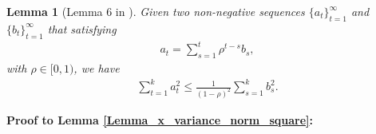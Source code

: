 \documentclass{article}
\newtheorem{Lemma}{\bf{Lemma}}
\begin{document}
\begin{Lemma}[Lemma $6$ in \citep{Tang:2018un}]
\label{Lemma_hanlin_2}
Given two non-negative sequences $\{a_t\}_{t=1}^{\infty}$ and $\{b_t\}_{t=1}^{\infty}$ that satisfying
\begin{align}
\nonumber
a_t = \sum_{s=1}^t \rho^{t-s} b_s,
\end{align} with $\rho \in [0,1)$, we have
\begin{align}
\nonumber
\sum_{t=1}^k a_t^2 \le \frac{1}{(1-\rho)^2}\sum_{s=1}^k b_s^2.
\end{align}
\end{Lemma}





\textbf{ Proof to Lemma \ref{Lemma_x_variance_norm_square}:}
%
\end{document}
